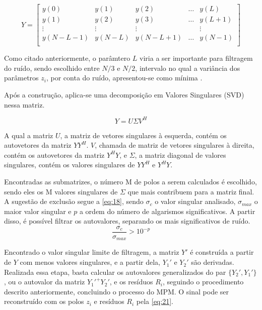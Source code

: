 \documentclass[12pt]{article}
\begin{document}
\begin{equation} \label{eq:16}
    Y = \begin{bmatrix} y(0) &y(1) & y(2) & \dots & y(L) \\
                        y(1) & y(2) & y(3) & \dots & y(L + 1) \\
                        \vdots & \vdots & \vdots & & \vdots \\
                        y(N - L -1) & y(N-L) & y(N - L + 1) & \dots & y(N-1) \\
    \end{bmatrix}
\end{equation}

Como citado anteriormente, o parâmtero $L$ viria a ser importante para filtragem do ruído, sendo escolhido entre $N/3$ e $N/2$, intervalo no qual 
a variância dos parâmetros $z_i$, por conta do ruído, apresentou-se como mínima \cite{370583}.

Após a construção, aplica-se uma decomposição em Valores Singulares (SVD) nessa matriz. 

\begin{equation} \label{eq:17}
    Y = U \Sigma V^H
\end{equation}

A qual a matriz $U$, a matriz de vetores singulares à esquerda, contém os autovetores da matriz $YY^H$. $V$, chamada de matriz de vetores singulares 
à direita, contém os autovetores da matriz $Y^HY$, e $\Sigma$, a matriz diagonal de valores singulares, contém os valores singulares de $YY^H$ e $Y^HY$.

Encontradas as submatrizes, o número M de polos a serem calculados é escolhido, sendo eles os M valores singulares de $\Sigma$ que mais contribuem para a matriz final. 
A sugestão de exclusão segue a \autoref{eq:18}, sendo $\sigma_c$ o valor singular analisado, $\sigma _{max}$ o maior valor singular e $p$ a ordem do número de algarismos significativos. 
A partir disso, é possível filtrar os autovalores, separando os mais significativos de ruído.
\begin{equation} \label{eq:18}
    \frac{\sigma_c}{\sigma _{max}} > 10^{-p}
\end{equation}

Encontrado o valor singular limite de filtragem, a matriz $Y'$ é construída a partir de $Y$ com menos valores singulares, e a partir dela, $Y_1'$ e $Y_2'$ são derivadas. Realizada essa etapa, 
basta calcular os autovalores generalizados do par $\{Y_2', Y_1'\}$, ou o autovalor da matriz $Y_1'^+Y_2'$, e os resíduos $R_i$, seguindo o procedimento descrito anteriormente,
concluindo o processo do MPM. O sinal pode ser reconstruído com os polos $z_i$ e resíduos $R_i$ pela \autoref{eq:21}.
\end{document}
